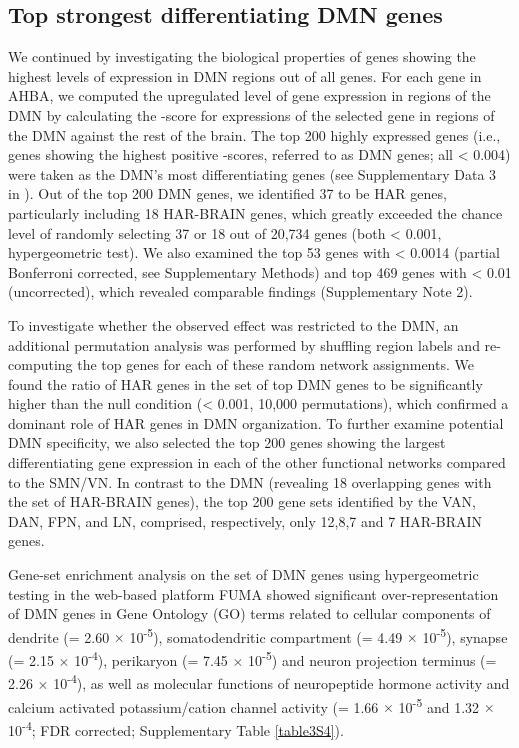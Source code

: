 \begin{refsection}
\subsection*{Top strongest differentiating DMN genes}
We continued by investigating the biological properties of genes showing the highest levels of expression in DMN regions out of all genes. For each gene in AHBA, we computed the upregulated level of gene expression in regions of the DMN by calculating the \tvaldf-score for expressions of the selected gene in regions of the DMN against the rest of the brain. The top 200 highly expressed genes (i.e., genes showing the highest positive \tvaldf-scores, referred to as DMN genes; all \pval < 0.004) were taken as the DMN’s most differentiating genes (see Supplementary Data 3 in \citep{Wei2019GeneticMA}). Out of the top 200 DMN genes, we identified 37 to be HAR genes, particularly including 18 HAR-BRAIN genes, which greatly exceeded the chance level of randomly selecting 37 or 18 out of 20,734 genes (both \pval < 0.001, hypergeometric test). We also examined the top 53 genes with \pval < 0.0014 (partial Bonferroni corrected, see Supplementary Methods) and top 469 genes with \pval < 0.01 (uncorrected), which revealed comparable findings (Supplementary Note 2).

To investigate whether the observed effect was restricted to the DMN, an additional permutation analysis was performed by shuffling region labels and re-computing the top genes for each of these random network assignments. We found the ratio of HAR genes in the set of top DMN genes to be significantly higher than the null condition (\pval < 0.001, 10,000 permutations), which confirmed a dominant role of HAR genes in DMN organization. To further examine potential DMN specificity, we also selected the top 200 genes showing the largest differentiating gene expression in each of the other functional networks compared to the SMN/VN. In contrast to the DMN (revealing 18 overlapping genes with the set of HAR-BRAIN genes), the top 200 gene sets identified by the VAN, DAN, FPN, and LN, comprised, respectively, only 12,8,7 and 7 HAR-BRAIN genes.

Gene-set enrichment analysis on the set of DMN genes using hypergeometric testing in the web-based platform FUMA \citep{watanabe2017functional} showed significant over-representation of DMN genes in Gene Ontology (GO) terms related to cellular components of dendrite (\pval = 2.60 $\times$ 10\textsuperscript{-5}), somatodendritic compartment (\pval = 4.49 $\times$ 10\textsuperscript{-5}), synapse (\pval = 2.15 $\times$ 10\textsuperscript{-4}), perikaryon (\pval = 7.45 $\times$ 10\textsuperscript{-5}) and neuron projection terminus (\pval = 2.26 $\times$ 10\textsuperscript{-4}), as well as molecular functions of neuropeptide hormone activity and calcium activated potassium/cation channel activity (\pval = 1.66 $\times$ 10\textsuperscript{-5} and 1.32 $\times$ 10\textsuperscript{-4}; FDR corrected; Supplementary Table \ref{table3S4}).


\end{refsection}
